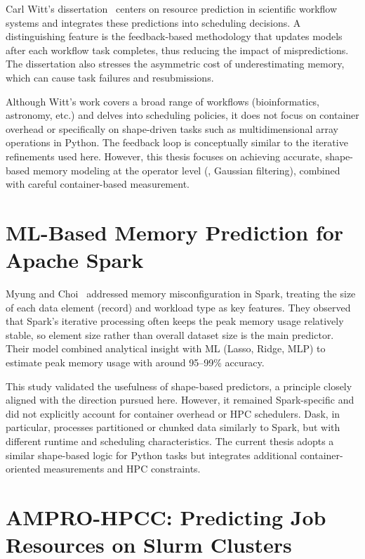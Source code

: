 Carl Witt's dissertation~\cite{witt2020} centers on resource prediction in scientific workflow systems and integrates these predictions into scheduling decisions.
A distinguishing feature is the feedback-based methodology that updates models after each workflow task completes, thus reducing the impact of mispredictions.
The dissertation also stresses the asymmetric cost of underestimating memory, which can cause task failures and resubmissions.

Although Witt's work covers a broad range of workflows (bioinformatics, astronomy, etc.) and delves into scheduling policies, it does not focus on container overhead or specifically on shape-driven tasks such as multidimensional array operations in Python.
The feedback loop is conceptually similar to the iterative refinements used here. However, this thesis focuses on achieving accurate, shape-based memory modeling at the operator level (\eg, Gaussian filtering), combined with careful container-based measurement.


\section{\ac{ML}-Based Memory Prediction for Apache Spark}
\label{sec:rw-spark-prediction}

Myung and Choi~\cite{myung2021} addressed memory misconfiguration in Spark, treating the size of each data element (record) and workload type as key features.
They observed that Spark's iterative processing often keeps the peak memory usage relatively stable, so element size rather than overall dataset size is the main predictor.
Their model combined analytical insight with \ac{ML} (Lasso, Ridge, MLP) to estimate peak memory usage with around 95--99\% accuracy.

This study validated the usefulness of shape-based predictors, a principle closely aligned with the direction pursued here.
However, it remained Spark-specific and did not explicitly account for container overhead or HPC schedulers.
Dask, in particular, processes partitioned or chunked data similarly to Spark, but with different runtime and scheduling characteristics.
The current thesis adopts a similar shape-based logic for Python tasks but integrates additional container-oriented measurements and HPC constraints.


\section{AMPRO-HPCC: Predicting Job Resources on Slurm Clusters}
\label{sec:rw-ampro-hpcc}

